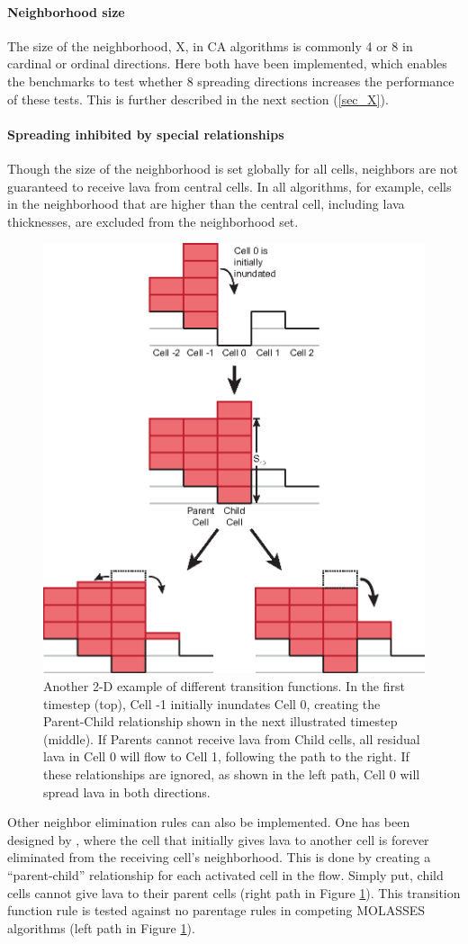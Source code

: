 \documentclass[12pt,letter]{article}
\begin{document}
		\paragraph{Neighborhood size} The size of the neighborhood, X, in CA algorithms is commonly 4 or 8 in cardinal or ordinal directions. Here both have been implemented, which enables the benchmarks to test whether 8 spreading directions increases the performance of these tests. This is further described in the next section (\ref{sec_X}).

		\paragraph{Spreading inhibited by special relationships} Though the size of the neighborhood is set globally for all cells, neighbors are not guaranteed to receive lava from central cells. In all algorithms, for example, cells in the neighborhood that are higher than the central cell, including lava thicknesses, are excluded from the neighborhood set.
		
		\begin{figure}[!h]
			\centering
			\includegraphics[width=0.5\linewidth]{figures/parent-child-example}
			\caption{Another 2-D example of different transition functions. In the first timestep (top), Cell -1 initially inundates Cell 0, creating the Parent-Child relationship shown in the next illustrated timestep (middle). If Parents cannot receive lava from Child cells, all residual lava in Cell 0 will flow to Cell 1, following the path to the right. If these relationships are ignored, as shown in the left path, Cell 0 will spread lava in both directions.}
			\label{fig_ParentTrap}
		\end{figure}
		
		Other neighbor elimination rules can also be implemented. One has been designed by \citet{connor2012}, where the cell that initially gives lava to another cell is forever eliminated from the receiving cell's neighborhood. This is done by creating a ``parent-child'' relationship for each activated cell in the flow. Simply put, child cells cannot give lava to their parent cells (right path in Figure \ref{fig_ParentTrap}). This transition function rule is tested against no parentage rules in competing MOLASSES algorithms (left path in Figure \ref{fig_ParentTrap}).
		
\end{document}
